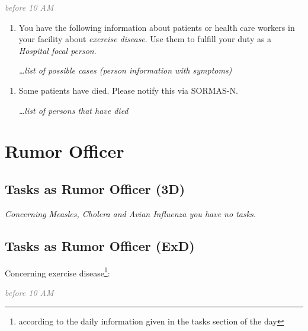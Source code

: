 \documentclass[a4paper, titlepage]{tufte-handout}
\begin{document}
\emph{\textcolor{gray}{before 10 AM}}

\begin{enumerate}
\item You have the following information about patients or health care workers in your facility about \emph{exercise disease}. Use them to fulfill your duty as a \emph{Hospital focal person}.

\emph{\ldots list of possible cases (person information with symptoms)}
\end{enumerate}


\begin{enumerate}
\item Some patients have died. Please notify this via SORMAS-N.

\emph{\ldots list of persons that have died}
\end{enumerate}

\section{Rumor Officer}
\label{sec-3}

\subsection{Tasks as Rumor Officer (3D)}
\label{sec-3-1}

\emph{Concerning Measles, Cholera and Avian Influenza you have no tasks.}

\subsection{Tasks as Rumor Officer (ExD)}
\label{sec-3-2}

Concerning exercise disease\footnote{according to the daily information given in the tasks section of the day}:

\emph{\textcolor{gray}{before 10 AM}}
\end{document}
